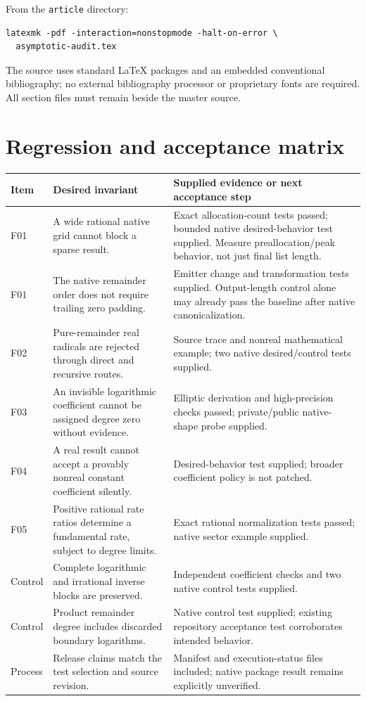 From the \texttt{article} directory:
\begin{lstlisting}
latexmk -pdf -interaction=nonstopmode -halt-on-error \
  asymptotic-audit.tex
\end{lstlisting}
The source uses standard LaTeX packages and an embedded conventional bibliography; no external bibliography processor or proprietary fonts are required. All section files must remain beside the master source.

\section{Regression and acceptance matrix}

\begin{longtable}{@{}P{1.4cm}P{6.6cm}P{6.9cm}@{}}
\toprule Item & Desired invariant & Supplied evidence or next acceptance step \\\midrule
\endhead
F01 & A wide rational native grid cannot block a sparse result. & Exact allocation-count tests passed; bounded native desired-behavior test supplied. Measure preallocation/peak behavior, not just final list length.\\
F01 & The native remainder order does not require trailing zero padding. & Emitter change and transformation tests supplied. Output-length control alone may already pass the baseline after native canonicalization.\\
F02 & Pure-remainder real radicals are rejected through direct and recursive routes. & Source trace and nonreal mathematical example; two native desired/control tests supplied.\\
F03 & An invisible logarithmic coefficient cannot be assigned degree zero without evidence. & Elliptic derivation and high-precision checks passed; private/public native-shape probe supplied.\\
F04 & A real result cannot accept a provably nonreal constant coefficient silently. & Desired-behavior test supplied; broader coefficient policy is not patched.\\
F05 & Positive rational rate ratios determine a fundamental rate, subject to degree limits. & Exact rational normalization tests passed; native sector example supplied.\\
Control & Complete logarithmic and irrational inverse blocks are preserved. & Independent coefficient checks and two native control tests supplied.\\
Control & Product remainder degree includes discarded boundary logarithms. & Native control test supplied; existing repository acceptance test corroborates intended behavior.\cite{acceptance}\\
Process & Release claims match the test selection and source revision. & Manifest and execution-status files included; native package result remains explicitly unverified.\\
\bottomrule
\end{longtable}

